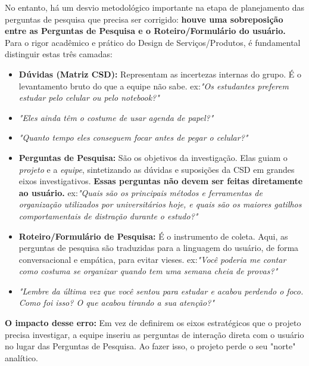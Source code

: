 \documentclass[
  sigconf,
  nonacm, %
  language=portuguese
]{acmart}
\begin{document}
No entanto, há um desvio metodológico importante na etapa de planejamento das perguntas de pesquisa que precisa ser corrigido: \textbf{houve uma sobreposição entre as Perguntas de Pesquisa e o Roteiro/Formulário do usuário. }Para o rigor acadêmico e prático do Design de Serviços/Produtos, é fundamental distinguir estas três camadas:

\begin{itemize}[leftmargin=14pt,itemsep=2pt,topsep=4pt]
  \item \textbf{Dúvidas (Matriz CSD):} Representam as incertezas internas do grupo. É o levantamento bruto do que a equipe não sabe. ex:\textit{"Os estudantes preferem estudar pelo celular ou pelo notebook?"}
  \item \textit{"Eles ainda têm o costume de usar agenda de papel?"}
  \item \textit{"Quanto tempo eles conseguem focar antes de pegar o celular?"}
\end{itemize}

\begin{itemize}[leftmargin=14pt,itemsep=2pt,topsep=4pt]
  \item \textbf{Perguntas de Pesquisa:} São os objetivos da investigação. Elas guiam o \textit{projeto} e a \textit{equipe}, sintetizando as dúvidas e suposições da CSD em grandes eixos investigativos. \textbf{Essas perguntas não devem ser feitas diretamente ao usuário. }ex:\textit{"Quais são os principais métodos e ferramentas de organização utilizados por universitários hoje, e quais são os maiores gatilhos comportamentais de distração durante o estudo?"}
\end{itemize}

\begin{itemize}[leftmargin=14pt,itemsep=2pt,topsep=4pt]
  \item \textbf{Roteiro/Formulário de Pesquisa:} É o instrumento de coleta. Aqui, as perguntas de pesquisa são traduzidas para a linguagem do usuário, de forma conversacional e empática, para evitar vieses. ex:\textit{"Você poderia me contar como costuma se organizar quando tem uma semana cheia de provas?"}
  \item \textit{"Lembre da última vez que você sentou para estudar e acabou perdendo o foco. Como foi isso? O que acabou tirando a sua atenção?"}
\end{itemize}

\textbf{O impacto desse erro:} Em vez de definirem os eixos estratégicos que o projeto precisa investigar, a equipe inseriu as perguntas de interação direta com o usuário no lugar das Perguntas de Pesquisa. Ao fazer isso, o projeto perde o seu "norte" analítico.
\end{document}
